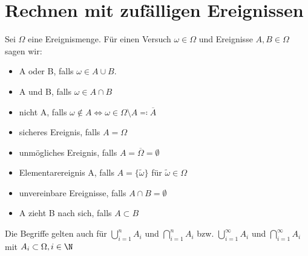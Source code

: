 \section{Rechnen mit zufälligen Ereignissen}
\begin{notation}
Sei $\Omega$ eine Ereignismenge. Für einen Versuch $\omega \in \Omega$ und Ereignisse $A,B \in \Omega$ sagen wir:  
\begin{itemize}
	\item A oder B, falls $\omega \in A \cup B$.
	\item A und B, falls $\omega \in A \cap B$
	\item nicht A, falls $ \omega \not\in A \iff \omega \in \Omega \setminus A \eqqcolon \overline{A}$ 
	\item sicheres Ereignis, falls $A=\Omega$
	\item unmögliches Ereignis, falls $A=\overline{\Omega}= \emptyset$
	\item Elementarereignis A, falls $A = \{\tilde{\omega}\}$ für $\tilde{\omega}\in \Omega$
	\item unvereinbare Ereignisse, falls $A \cap B= \emptyset$
	\item A zieht B nach sich, falls $A \subset B$ 
\end{itemize}
\end{notation}
\begin{remark}
	Die Begriffe gelten auch für $\bigcup_{i=1}^{n} A_i$ und $\bigcap_{i=1}^n A_i$ bzw.
	$\bigcup_{i=1}^{\infty} A_i$ und $\bigcap_{i=1}^{\infty}A_i$ mit $A_i \subset \Omega, i \in \N$  
\end{remark}
